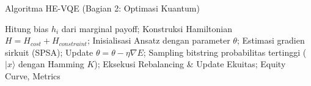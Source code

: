 \documentclass{beamer}
\begin{document}
\begin{frame}{Algoritma HE-VQE (Bagian 2: Optimasi Kuantum)}
    \begin{algorithm}[H]
        \tiny
        \caption{Portfolio Optimization via HE-VQE (Part 2)}
        \begin{algorithmic}[1]
                    \State Hitung bias $h_i$ dari marginal payoff;
                    \State Konstruksi Hamiltonian $H = H_{cost} + H_{constraint}$;
                    \State Inisialisasi Ansatz dengan parameter $\theta$;
                        \State Estimasi gradien sirkuit (SPSA);
                        \State Update $\theta = \theta - \eta\nabla E$;
                    \EndWhile
                    \State Sampling bitstring probabilitas tertinggi ($|x\rangle$ dengan Hamming $K$);
                    \State Eksekusi Rebalancing \& Update Ekuitas;
                \EndFor
                \State \Return Equity Curve, Metrics
            \EndFunction
        \end{algorithmic}
    \end{algorithm}
\end{frame}
\end{document}
